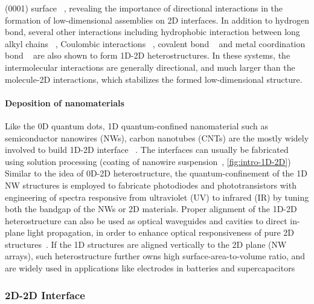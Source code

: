 (0001) surface
~\autocite{Meier_2010_polycyclic_gr,Roos_2011_BTP_gr,Roos_2011_hiera_org_gr},
revealing the importance of directional interactions in the
formation of low-dimensional assemblies on 2D
interfaces.
%
In addition to hydrogen bond, several other interactions including
hydrophobic interaction between long alkyl chains
~\autocite{De_Feyter_2003_2D_assem_rev, Deshpande_2012_1D_assemb_gr},
Coulombic interactions ~\autocite{Prado_2011_2D_acid_gr}, covalent bond
~\autocite{Colson_2011_2DMOF_gr,Colson_2014_2D_COF_gr} and metal
coordination bond ~\autocite{Urgel_2015_MOF_BN} are also shown to form
1D-2D heterostructures. In these systems, the intermolecular
interactions are generally directional, and much larger than the molecule-2D
interactions, which stabilizes the formed low-dimensional structure.

\paragraph{Deposition of nano\-materials}
Like the 0D quantum dots, 1D quantum-confined nano\-material such as
semiconductor nanowires (NWs), carbon nano\-tubes (CNTs) are the
mostly widely involved to build 1D-2D interface
~\autocite{Jariwala_2013_CNT-mos2,Jariwala_2014_solution_CNT,Fu_2012_gr_ZnONW,Wu_2010_NW_supercap,Gan_2013_Si_WG}.
%
The interfaces can usually be fabricated using solution processing
(\eg coating of nanowire suspension~\autocite{Jariwala_2014_solution_CNT},
\autoref{fig:intro-1D-2D})
%
Similar to the idea of 0D-2D heterostructure, the quantum-confinement
of the 1D NW structures is employed to fabricate photo\-diodes and
photo\-transistors with engineering of spectra responsive from
ultraviolet (UV) to infrared (IR) \autocite{Nie_2013_NW_array,Gao_2013_NW_gr,Miao_2014_NW_IR,Jariwala_2013_CNT-mos2,Spina_2015_perov_nw}
by tuning both the bandgap of the NWs or 2D materials.
%
Proper alignment of the 1D-2D heterostructure can also be used as
optical waveguides and cavities to direct in-plane light propagation,
in order to enhance optical responsiveness of pure 2D structures~\autocite{Gan_2013_Si_WG,Pospischil_2013_CMOS}.
%
If the 1D structures are aligned vertically to the 2D plane (\ie NW
arrays), such heterostructure further owns high surface-area-to-volume
ratio, and are widely used in applications like electrodes in
batteries and super\-capacitors \autocite{Wu_2010_NW_supercap,Liu_2011_V2O5NW}


\subsubsection{2D-2D Interface}
\label{sec:intro-2D-2D}

